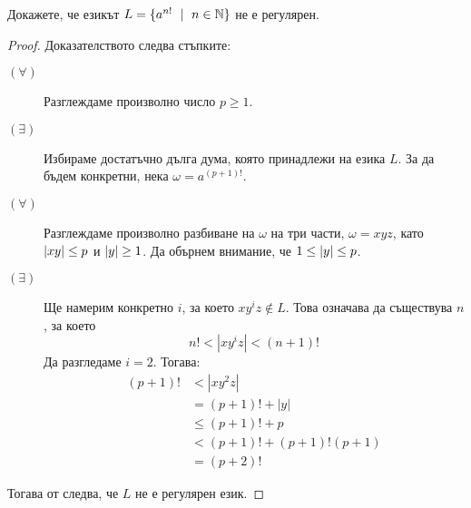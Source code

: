 \begin{extra}
\begin{problem}
  Докажете, че езикът $L = \{a^{n!}\ \mid\ n\in\Nat\}$ не е регулярен.  
\end{problem}
\begin{proof}
  Доказателството следва стъпките:
  \begin{description}
  \item[$(\forall)$]
    Разглеждаме произволно число $p \geq 1$.
  \item[$(\exists)$]
    Избираме достатъчно дълга дума, която принадлежи на езика $L$. 
    За да бъдем конкретни, нека $\omega = a^{(p+1)!}$.
  \item[$(\forall)$]
    Разглеждаме произволно разбиване на $\omega$ на три части, $\omega = xyz$, 
    като $\vert{xy}\vert \leq p$ и $\vert{y}\vert \geq 1$.
    Да обърнем внимание, че $1 \leq \vert{y}\vert \leq p$.
  \item[$(\exists)$]
    Ще намерим конкретно $i$, за което $xy^iz \not\in L$.
    Това означава да съществува $n$, за което
    \[n! < |xy^iz| < (n+1)!\]
    Да разгледаме $i = 2$. Тогава:
    \begin{align*}
      (p+1)! & < |xy^2z| \\
             & = (p+1)! + |y|\\
             & \leq (p+1)! + p \\
             & < (p+1)! + (p+1)!(p+1) \\
             & = (p+2)!
    \end{align*}
  \end{description}
  Тогава от  следва, че $L$ не е регулярен език.  
\end{proof}


\end{extra}
